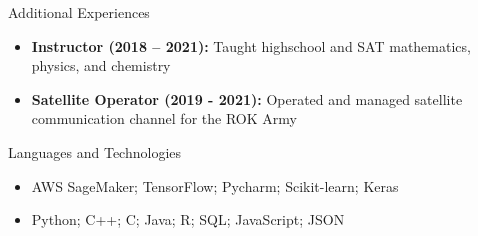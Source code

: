 \documentclass[calibri]{mcdowellcv}
\begin{document}
	\begin{cvsection}{Additional Experiences}
		\begin{cvsubsection}{}{}{}	
			\begin{itemize}
				\item \textbf{Instructor (2018 – 2021):} Taught highschool and SAT mathematics, physics, and chemistry
				\item \textbf{Satellite Operator (2019 - 2021):} Operated and managed satellite communication channel for the ROK Army
			\end{itemize}
		\end{cvsubsection}
	\end{cvsection}
	
	\begin{cvsection}{Languages and Technologies}
		\begin{cvsubsection}{}{}{}	
			\begin{itemize}
				\item AWS SageMaker; TensorFlow; Pycharm; Scikit-learn; Keras
				\item Python; C++; C; Java; R; SQL; JavaScript; JSON 
			\end{itemize}
		\end{cvsubsection}
	\end{cvsection}
	
\end{document}
